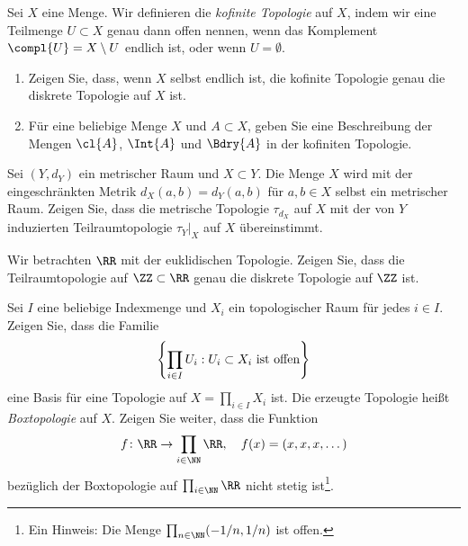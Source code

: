 

\setcounter{Sheet}{2}



\maketitle
\begin{exercise}
Sei $X$ eine Menge. Wir definieren die \emph{kofinite Topologie} auf $X$,
indem wir eine Teilmenge $U\subset X$ genau dann offen nennen, wenn das
Komplement $\compl{U} = X\setminus U$ endlich ist, oder wenn $U = \emptyset$.
\begin{enumerate}
\item Zeigen Sie, dass, wenn $X$ selbst endlich ist, die kofinite
    Topologie genau die diskrete Topologie auf $X$ ist.
\item Für eine beliebige Menge $X$ und $A\subset X$, geben Sie eine
    Beschreibung der Mengen $\cl{A}$, $\Int{A}$ und $\Bdry{A}$ in der kofiniten
    Topologie.
\end{enumerate}
\end{exercise}

\begin{exercise}
Sei $(Y,d_Y)$ ein metrischer Raum und $X\subset Y$. Die Menge $X$ wird mit
der eingeschränkten Metrik $d_X(a,b) = d_Y(a,b)$ für $a,b\in X$ selbst
ein metrischer Raum. Zeigen Sie, dass die metrische Topologie $\tau_{d_X}$
auf $X$ mit der von $Y$ induzierten Teilraumtopologie $\tau_Y|_X$ auf $X$
übereinstimmt.
\end{exercise}

\begin{exercise}
Wir betrachten $\RR$ mit der euklidischen Topologie. Zeigen Sie, dass die
Teilraumtopologie auf $\ZZ\subset\RR$ genau die diskrete Topologie auf
$\ZZ$ ist.
\end{exercise}

\begin{exercise}
Sei $I$ eine beliebige Indexmenge und $X_i$ ein topologischer Raum für
jedes $i\in I$. Zeigen Sie, dass die Familie
\[
\left\{ \prod_{i\in I} U_i : \textnormal{$U_i\subset X_i$ ist offen} \right\}
\]
eine Basis für eine Topologie auf $X = \prod_{i\in I} X_i$ ist. Die erzeugte
Topologie heißt \emph{Boxtopologie} auf $X$. Zeigen Sie weiter, dass die
Funktion
\[
f\colon \RR \to \prod_{i\in\NN} \RR,\quad f(x) = (x,x,x,\dots)
\]
bezüglich der Boxtopologie auf $\prod_{i\in\NN}\RR$ nicht stetig
ist\footnote{Ein Hinweis: Die Menge $\prod_{n\in\NN} (-1/n, 1/n)$ ist offen.}.
\end{exercise}


